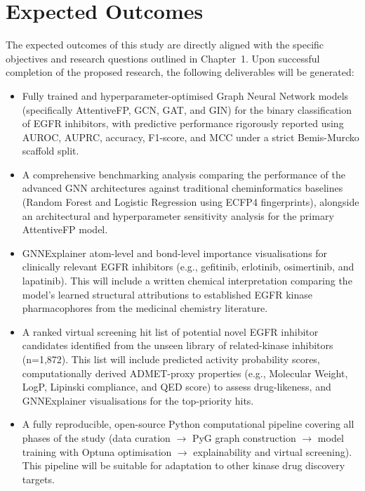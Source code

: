 \documentclass[12pt, a4paper]{article}
\numberwithin{equation}{section}
\begin{document}
\setcounter{page}{1}







\section*{Expected Outcomes}

The expected outcomes of this study are directly aligned with the specific objectives and research questions outlined in Chapter~1. Upon successful completion of the proposed research, the following deliverables will be generated:

\begin{itemize}
    \item Fully trained and hyperparameter-optimised Graph Neural Network models (specifically AttentiveFP, GCN, GAT, and GIN) for the binary classification of EGFR inhibitors, with predictive performance rigorously reported using AUROC, AUPRC, accuracy, F1-score, and MCC under a strict Bemis-Murcko scaffold split.
    \item A comprehensive benchmarking analysis comparing the performance of the advanced GNN architectures against traditional cheminformatics baselines (Random Forest and Logistic Regression using ECFP4 fingerprints), alongside an architectural and hyperparameter sensitivity analysis for the primary AttentiveFP model.
    \item GNNExplainer atom-level and bond-level importance visualisations for clinically relevant EGFR inhibitors (e.g., gefitinib, erlotinib, osimertinib, and lapatinib). This will include a written chemical interpretation comparing the model's learned structural attributions to established EGFR kinase pharmacophores from the medicinal chemistry literature.
    \item A ranked virtual screening hit list of potential novel EGFR inhibitor candidates identified from the unseen library of related-kinase inhibitors (n=1,872). This list will include predicted activity probability scores, computationally derived ADMET-proxy properties (e.g., Molecular Weight, LogP, Lipinski compliance, and QED score) to assess drug-likeness, and GNNExplainer visualisations for the top-priority hits.
    \item A fully reproducible, open-source Python computational pipeline covering all phases of the study (data curation $\rightarrow$ PyG graph construction $\rightarrow$ model training with Optuna optimisation $\rightarrow$ explainability and virtual screening). This pipeline will be suitable for adaptation to other kinase drug discovery targets.
\end{itemize}
\end{document}
